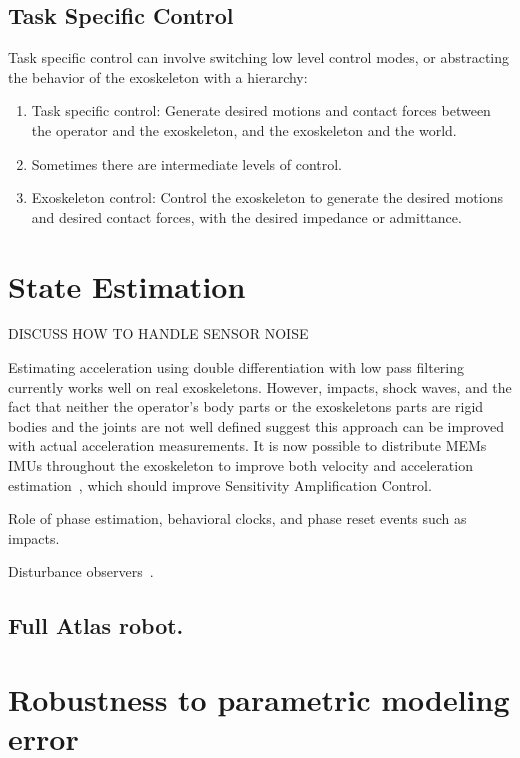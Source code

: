 \documentclass[letterpaper,12pt,fullpage]{article}
\begin{document}
\subsection{Task Specific Control}

Task specific control can involve switching low level control modes, or abstracting
the behavior of the exoskeleton with a hierarchy:
\begin{enumerate}
\item
Task specific control: Generate desired motions and contact forces between
the operator and the exoskeleton, and the exoskeleton and the world.
\item
Sometimes there are intermediate levels of control.
\item
Exoskeleton control: Control the exoskeleton to generate the desired motions and
desired contact forces, with the desired impedance or admittance.
\end{enumerate}

\section{State Estimation}

DISCUSS HOW TO HANDLE SENSOR NOISE

Estimating acceleration using double differentiation with low pass filtering
currently works well on real exoskeletons.
However, impacts, shock waves, and the fact that neither
the operator's body parts or the exoskeletons parts are rigid bodies and the
joints are not well defined suggest this approach can be improved with actual
acceleration measurements.
It is now possible to distribute MEMs IMUs throughout the exoskeleton to
improve both velocity and 
acceleration estimation~\cite{Xinjilefu-thesis}, which should improve
Sensitivity Amplification Control.

Role of phase estimation, behavioral clocks, and phase reset events
such as impacts.

Disturbance observers~\cite{IEEE06197032}.

\subsection{Full Atlas robot.}

\section{Robustness to parametric modeling error}
\end{document}
